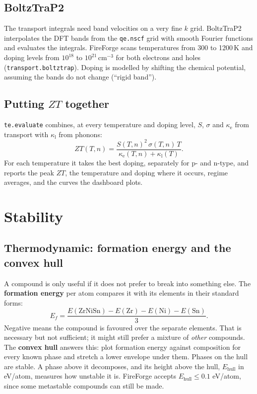 \documentclass[11pt,a4paper]{report}
\newcommand{\code}[1]{\texttt{#1}}
\newcommand{\kl}{\kappa_\mathrm{l}}
\newcommand{\ke}{\kappa_\mathrm{e}}
\begin{document}
\section{BoltzTraP2}

The transport integrals need band velocities on a very fine $k$ grid. BoltzTraP2 interpolates
the DFT bands from the \code{qe.nscf} grid with smooth Fourier functions and evaluates the
integrals. FireForge scans temperatures from 300 to 1200\,K and doping levels from $10^{18}$ to
$10^{21}$\,cm$^{-3}$ for both electrons and holes (\code{transport.boltztrap}). Doping is modelled
by shifting the chemical potential, assuming the bands do not change (``rigid band'').

\section{Putting $ZT$ together}

\code{te.evaluate} combines, at every temperature and doping level,
$S$, $\sigma$ and $\ke$ from transport with $\kl$ from phonons:
\[
  ZT(T,n) = \frac{S(T,n)^2\,\sigma(T,n)\,T}{\ke(T,n)+\kl(T)} .
\]
For each temperature it takes the best doping, separately for p- and n-type, and reports the
peak $ZT$, the temperature and doping where it occurs, regime averages, and the curves the
dashboard plots.

\chapter{Stability}

\section{Thermodynamic: formation energy and the convex hull}

A compound is only useful if it does not prefer to break into something else. The
\textbf{formation energy} per atom compares it with its elements in their standard forms:
\[
  E_f = \frac{E(\mathrm{ZrNiSn}) - E(\mathrm{Zr}) - E(\mathrm{Ni}) - E(\mathrm{Sn})}{3}.
\]
Negative means the compound is favoured over the separate elements. That is necessary but not
sufficient; it might still prefer a mixture of \emph{other} compounds. The \textbf{convex hull}
answers this: plot formation energy against composition for every known phase and stretch a
lower envelope under them. Phases on the hull are stable. A phase above it decomposes, and its
height above the hull, $E_\mathrm{hull}$ in eV/atom, measures how unstable it is. FireForge
accepts $E_\mathrm{hull}\le0.1$ eV/atom, since some metastable compounds can still be made.
\end{document}
